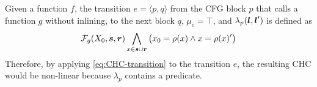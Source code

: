 Given a function $f$, the transition $e=\langle p,q\rangle$
from the CFG block $p$ that calls a function $g$ without
inlining, to the 
next block $q$, \mbox{$\mu_e=\top$}, and 
\mbox{$\lambda_p(\boldsymbol{l},\boldsymbol{l}')$} is defined as
\begin{align}
\label{eq:CHC-nl-tr_call}
\finP_g(X_0,\svar,\rvar)\bigwedge_{x\in\svar\cup\rvar}\big(x_0=\rho(x)\wedge x=\rho(x)'\big)
\end{align}
%
Therefore, by applying \cref{eq:CHC-transition}
to the transition $e$,
the resulting CHC would be non-linear because
$\lambda_p$ contains a predicate.















